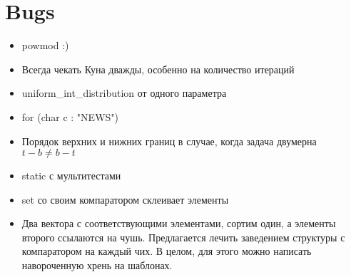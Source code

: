 \section{Bugs}

\begin{itemize}
    \item powmod :)

    \item Всегда чекать Куна дважды, особенно на количество итераций
    
    \item uniform\_int\_distribution от одного параметра
    
    \item for (char c : "NEWS")
    
    \item Порядок верхних и нижних границ в случае, когда задача двумерна
    $t - b \neq b - t$
    
    \item static с мультитестами

    \item set со своим компаратором склеивает элементы

    \item Два вектора с соответствующими элементами, сортим один, а элементы
    второго ссылаются на чушь. Предлагается лечить заведением структуры с
    компаратором на каждый чих. В целом, для этого можно написать навороченную
    хрень на шаблонах.
\end{itemize}
